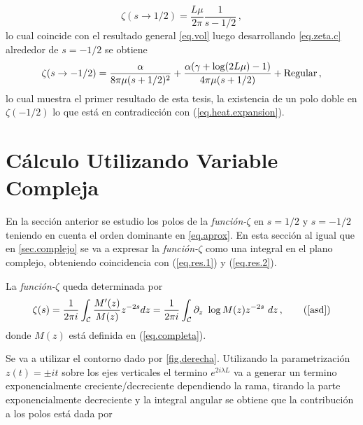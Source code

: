 \begin{equation}\label{eq.res.2}
    \zeta  (s \rightarrow 1/2) = \frac{L \mu }{2 \pi} \frac{1}{s-1/2}    
    	\, ,
\end{equation}
lo cual coincide con el resultado general \ref{eq.vol} luego desarrollando \ref{eq.zeta.c} alrededor de $s=-1/2$ se obtiene
\begin{equation}\label{eq.res.1}
    \zeta  (s \rightarrow -1/2 ) =  \frac{\alpha}{8  \pi \mu (s+1/2)^2} +
    \frac{ \alpha ( \gamma  +  \log (2L \mu ) -1 ) }{4  \pi \mu (s+1/2) }  + 
    {\rm Regular}
    	\, ,
\end{equation}
lo cual muestra el primer resultado de esta tesis, la existencia de un polo doble en $\zeta(-1/2)$ lo que está en contradicción con (\ref{eq.heat.expansion}).

\section{Cálculo Utilizando Variable Compleja}\label{seq.2.com}


En la sección anterior se estudio los polos de la {\it función-$\zeta$} en $s=1/2$ y $s=-1/2$ teniendo en cuenta el orden dominante en \ref{eq.aprox}.
En esta sección al igual que en \ref{sec.complejo} se va a expresar la {\it función-$\zeta $} como una integral en el plano complejo, obteniendo coincidencia con (\ref{eq.res.1}) y (\ref{eq.res.2}).

La {\it función-$ \zeta$} queda determinada por
\begin{equation}
\zeta (s) = 
\frac{1}{2 \pi i} 
\int _{\mathcal{C}}
\frac{M ' ( z ) }{ M ( z ) } z ^{-2s} d z = 
\frac{1}{2 \pi i} 
\int _{\mathcal{C}}
\partial _z \ \log 	M(z)  z ^{-2s} \ dz
	\, ,
	\tag{\ref{asd}}
\end{equation}
donde $M (z)$ está definida en (\ref{eq.completa}).

Se va a utilizar el contorno dado por \ref{fig.derecha}. 
Utilizando la parametrización $ z (t) = \pm i t$ sobre los ejes verticales el termino $e ^{2 i \lambda L}$ va a generar un termino exponencialmente creciente/decreciente dependiendo la rama, tirando la parte exponencialmente decreciente y la integral angular se obtiene que la contribución a los polos está dada por 
\begin{comment}
\begin{equation}
\begin{array}{c}
    \zeta  (s) = \\
     \frac{1}{2 \pi i} \int _{\infty} ^{1}
     \frac{ i \alpha }{2 t^2} 
     \left(
      1 + \frac{i \pi}{2} + Ln[2 t] + \psi (1 + \frac{\beta}{2 t})
     \right)
     t ^{-2s}
     e ^{- i \pi s} (i dt) + \\
     \frac{1}{2 \pi i} \int _{\infty} ^{1} 
     \left(
     2 + \frac{\beta}{2 t^2}
     \left(
     1 + \frac{i \pi}{2} - Ln[2 t] - \psi (1+ \frac{\beta}{2 t})
     \right)
     t ^{-2s}
     e ^{ i \pi s} (-i dt)
     \right)     
\end{array}
\end{equation}
\end{comment}

